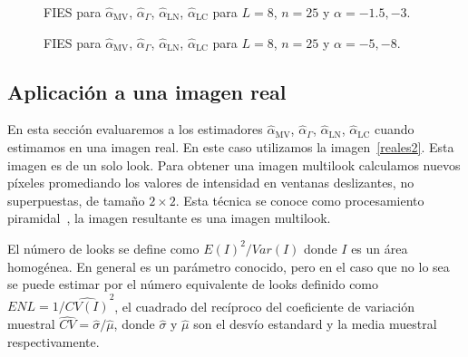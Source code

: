 \begin{figure}[htb]
	\caption{\label{InflL8n25}\small FIES para $\widehat{\alpha}_{\text{MV}}$, $\widehat{\alpha}_{\Gamma}$, $\widehat{\alpha}_{\text{LN}}$, $\widehat{\alpha}_{\text{LC}}$ para $L=8$, $n=25$ y $\alpha=-1.5,-3$.}
\end{figure}

\begin{figure}[htb]
	\caption{\label{InflL8n25}\small FIES para $\widehat{\alpha}_{\text{MV}}$, $\widehat{\alpha}_{\Gamma}$, $\widehat{\alpha}_{\text{LN}}$, $\widehat{\alpha}_{\text{LC}}$ para $L=8$, $n=25$ y $\alpha=-5,-8$.}
\end{figure}

\subsection{Aplicación a una imagen real}
\label{AplicacionImagenReal}

En esta sección evaluaremos a los estimadores $\widehat{\alpha}_{\text{MV}}$, $\widehat{\alpha}_{\Gamma}$, $\widehat{\alpha}_{\text{LN}}$, $\widehat{\alpha}_{\text{LC}}$ cuando estimamos en una imagen real. En este caso utilizamos la imagen~\ref{reales2}. Esta imagen es de un solo look. Para obtener una imagen multilook calculamos nuevos píxeles promediando los valores de intensidad en ventanas deslizantes, no superpuestas, de tamaño $2\times2$. Esta técnica se conoce como procesamiento piramidal~\cite{Adelson1984}, la imagen resultante es una imagen multilook. 

El número de looks se define como $E(I)^2/Var(I)$ donde $I$ es un área homogénea. En general es un parámetro conocido, pero en el caso que no lo sea se puede estimar por el número equivalente de looks definido como $ENL=1/\widehat{CV(I)}^2$, el cuadrado del recíproco del coeficiente de variación muestral $\widehat{CV}=\widehat{\sigma}/\widehat{\mu}$, donde $\widehat{\sigma}$ y $\widehat{\mu}$ son el desvío estandard y la media muestral respectivamente.

